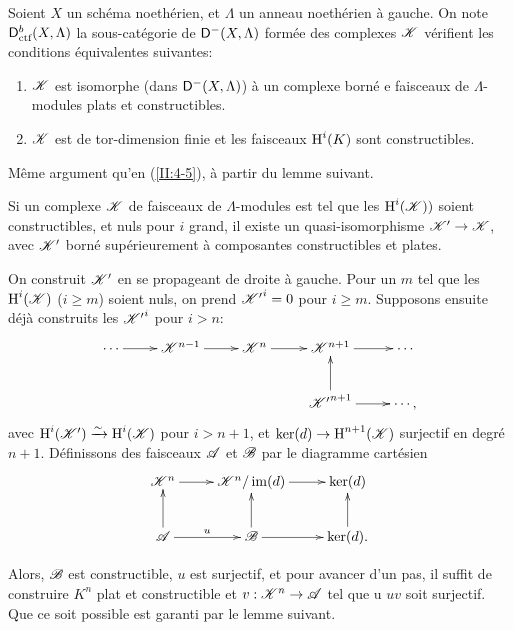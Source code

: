 \begin{prop-def_}\label{II:4-6}
Soient $X$ un sch\'ema noeth\'erien, et $\Lambda$ un anneau noeth\'erien \`a 
gauche. On note $\mathsf{D}_\textnormal{ctf}^b(X,\Lambda)$ la sous-cat\'egorie de 
$\mathsf{D}^-(X,\Lambda)$ form\'ee des complexes $\mathscr{K}$ v\'erifient les conditions 
\'equivalentes suivantes:
\begin{enumerate}[\indent i)]
  \item $\mathscr{K}$ est isomorphe (dans $\mathsf{D}^-(X,\Lambda)$) \`a un complexe born\'e e 
    faisceaux de $\Lambda$-modules plats et constructibles. 
  \item $\mathscr{K}$ est de tor-dimension finie et les faisceaux $\operatorname{H}^i(K)$ sont 
    constructibles. 
\end{enumerate}
\end{prop-def_}

M\^eme argument qu'en (\ref{II:4-5}), \`a partir du lemme suivant. 





\begin{lemma_}\label{II:4-7}
Si un complexe $\mathscr{K}$ de faisceaux de $\Lambda$-modules est tel que les 
$\operatorname{H}^i(\mathscr{K}))$ soient constructibles, et nuls pour $i$ grand, il existe un 
quasi-isomorphisme $\mathscr{K}'\to \mathscr{K}$, avec $\mathscr{K}'$ born\'e sup\'erieurement \`a 
composantes constructibles et plates.
\end{lemma_}

On construit $\mathscr{K}'$ en se propageant de droite \`a gauche. Pour un $m$ tel que les 
$\operatorname{H}^i(\mathscr{K})$ ($i\geqslant m$) soient nuls, on prend ${\mathscr{K}'}^i = 0$ pour 
$i\geqslant m$. Supposons ensuite d\'ej\`a construits les ${\mathscr{K}'}^i$ pour 
$i>n$:
\[\xymatrix{
  \cdots \ar[r] 
    & \cK^{n-1} \ar[r] 
    & \cK^n \ar[r] 
    & \cK^{n+1} \ar[r] 
    & \cdots \\
  & & & {\cK'}^{n+1} \ar[u] \ar[r] 
    & \cdots \text{,}
}\]
avec $\operatorname{H}^i(\mathscr{K}')\xrightarrow\sim \operatorname{H}^i(\mathscr{K})$ pour $i>n+1$, et $\ker(d)\to\operatorname{H}^{n+1}(\mathscr{K})$ surjectif 
en degr\'e $n+1$. D\'efinissons des faisceaux $\mathscr{A}$ et $\mathscr{B}$ par le diagramme 
cart\'esien 
\[\xymatrix{
  \cK^n \ar[r] 
    & \cK^n/\im(d) \ar[r] 
    & \ker(d) \\
  \cA \ar[u] \ar[r]^u 
    & \cB \ar[u]\ar[r] 
    & \ker(d) \ar[u] \text{.}
}\]

Alors, $\mathscr{B}$ est constructible, $u$ est surjectif, et pour avancer d'un pas, il 
suffit de construire $K^n$ plat et constructible et $v:\mathscr{K}^n\to \mathscr{A}$ tel que u
$u v$ soit surjectif. Que ce soit possible est garanti par le lemme suivant. 





